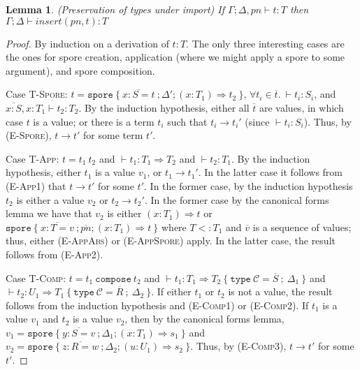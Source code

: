 \documentclass[a4paper,twoside]{article}
\newcommand{\seq}[1]{\overline{#1}}
\newtheorem{lemma}[theorem]{Lemma}
\begin{document}
\begin{lemma}
\emph{(Preservation of types under import)}
\label{lem:pres-import}
If $\Gamma ; \Delta, pn \vdash t : T$ then $\Gamma ; \Delta \vdash insert(pn, t) : T$
\end{lemma}
\begin{proof}
By induction on a derivation of $t : T$. The only three interesting cases are the ones for spore creation, application (where we might apply a spore to some argument), and spore composition.

Case \textsc{T-Spore}: $t = \texttt{spore}~\{~\seq{x : S = t}~; \Delta'; (x: T_1) \Rightarrow t_2~\}$, $\forall t_i \in \seq{t}.~\vdash t_i : S_i$, and $\seq{x : S}, x : T_1 \vdash t_2 : T_2$. By the induction hypothesis, either all $\seq{t}$ are values, in which case $t$ is a value; or there is a term $t_i$ such that $t_i \rightarrow t_i'$ (since $\vdash t_i : S_i$). Thus, by (\textsc{E-Spore}), $t \rightarrow t'$ for some term $t'$.

Case \textsc{T-App}: $t = t_1~t_2$ and $\vdash t_1 : T_1 \Rightarrow T_2$ and $\vdash t_2 : T_1$. By the induction hypothesis, either $t_1$ is a value $v_1$, or $t_1 \rightarrow t_1'$. In the latter case it follows from (\textsc{E-App1}) that $t \rightarrow t'$ for some $t'$. In the former case, by the induction hypothesis $t_2$ is either a value $v_2$ or $t_2 \rightarrow t_2'$. In the former case by the canonical forms lemma we have that $v_2$ is either $(x: T_1) \Rightarrow t$ or $\texttt{spore}~\{~\seq{x : T = v}~; \seq{pn} ; (x: T_1) \Rightarrow t~\}$ where $T <: T_1$ and $\seq{v}$ is a sequence of values; thus, either (\textsc{E-AppAbs}) or (\textsc{E-AppSpore}) apply. In the latter case, the result follows from (\textsc{E-App2}).

Case \textsc{T-Comp}: $t = t_1~\texttt{compose}~t_2$ and $\vdash t_1 : T_1 \Rightarrow T_2~\{~\texttt{type}~\mathcal{C} = \seq{S}~;~\Delta_1~\}$ and $\vdash t_2 : U_1 \Rightarrow T_1~\{~\texttt{type}~\mathcal{C} = \seq{R}~;~\Delta_2~\}$. If either $t_1$ or $t_2$ is not a value, the result follows from the induction hypothesis and (\textsc{E-Comp1}) or (\textsc{E-Comp2}). If $t_1$ is a value $v_1$ and $t_2$ is a value $v_2$, then by the canonical forms lemma, $v_1 = \texttt{spore}~\{~\seq{y : S = v}~; \Delta_1; (x: T_1) \Rightarrow s_1~\}$ and $v_2 = \texttt{spore}~\{~\seq{z : R = w}~; \Delta_2; (u: U_1) \Rightarrow s_2~\}$. Thus, by (\textsc{E-Comp3}), $t \rightarrow t'$ for some $t'$.

\end{proof}
\end{document}
